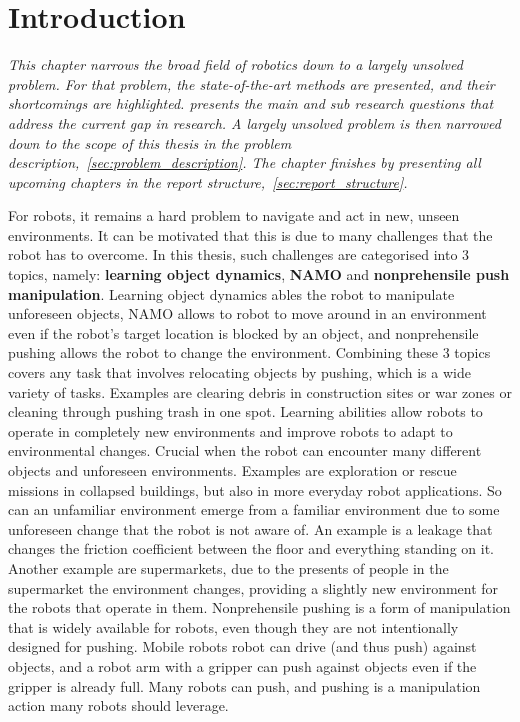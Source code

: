 \chapter{Introduction}%
\label{chap:introduction}
\textit{This chapter narrows the broad field of robotics down to a largely unsolved problem. For that problem, the state-of-the-art methods are presented, and their shortcomings are highlighted.  presents the main and sub research questions that address the current gap in research. A largely unsolved problem is then narrowed down to the scope of this thesis in the problem description,~\cref{sec:problem_description}. The chapter finishes by presenting all upcoming chapters in the report structure,~\cref{sec:report_structure}.\bs}


For robots, it remains a hard problem to navigate and act in new, unseen environments. It can be motivated that this is due to many challenges that the robot has to overcome. In this thesis, such challenges are categorised into 3 topics, namely: \textbf{learning object dynamics}, \textbf{\ac{NAMO}} and \textbf{nonprehensile push manipulation}. Learning object dynamics ables the robot to manipulate unforeseen objects, \ac{NAMO} allows to robot to move around in an environment even if the robot's target location is blocked by an object, and nonprehensile pushing allows the robot to change the environment. Combining these 3 topics covers any task that involves relocating objects by pushing, which is a wide variety of tasks. Examples are clearing debris in construction sites or war zones or cleaning through pushing trash in one spot. Learning abilities allow robots to operate in completely new environments and improve robots to adapt to environmental changes. Crucial when the robot can encounter many different objects and unforeseen environments. Examples are exploration or rescue missions in collapsed buildings, but also in more everyday robot applications. So can an unfamiliar environment emerge from a familiar environment due to some unforeseen change that the robot is not aware of. An example is a leakage that changes the friction coefficient between the floor and everything standing on it. Another example are supermarkets, due to the presents of people in the supermarket the environment changes, providing a slightly new environment for the robots that operate in them. Nonprehensile pushing is a form of manipulation that is widely available for robots, even though they are not intentionally designed for pushing. Mobile robots robot can drive (and thus push) against objects, and a robot arm with a gripper can push against objects even if the gripper is already full. Many robots can push, and pushing is a manipulation action many robots should leverage.\bs

